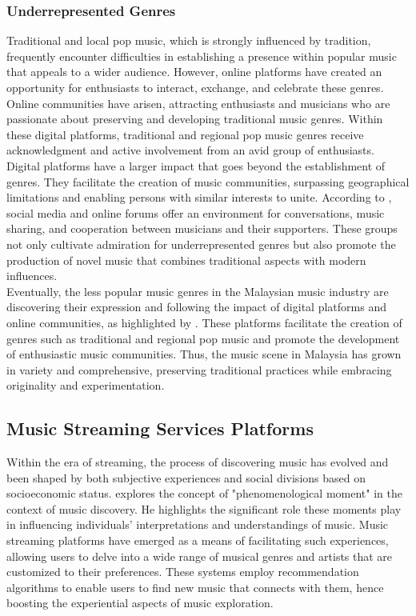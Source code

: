 \subsubsection{Underrepresented Genres}
Traditional and local pop music, which is strongly influenced by tradition, frequently encounter difficulties in establishing a presence within popular music that appeals to a wider audience. However, online platforms have created an opportunity for enthusiasts to interact, exchange, and celebrate these genres. Online communities have arisen, attracting enthusiasts and musicians who are passionate about preserving and developing traditional music genres. Within these digital platforms, traditional and regional pop music genres receive acknowledgment and active involvement from an avid group of enthusiasts. \\

Digital platforms have a larger impact that goes beyond the establishment of genres. They facilitate the creation of music communities, surpassing geographical limitations and enabling persons with similar interests to unite. According to \textcite{silahudin19}, social media and online forums offer an environment for conversations, music sharing, and cooperation between musicians and their supporters. These groups not only cultivate admiration for underrepresented genres but also promote the production of novel music that combines traditional aspects with modern influences. \\

Eventually, the less popular music genres in the Malaysian music industry are discovering their expression and following the impact of digital platforms and online communities, as highlighted by \textcite{silahudin19}. These platforms facilitate the creation of genres such as traditional and regional pop music and promote the development of enthusiastic music communities. Thus, the music scene in Malaysia has grown in variety and comprehensive, preserving traditional practices while embracing originality and experimentation.

\subsection{Music Streaming Services Platforms}
Within the era of streaming, the process of discovering music has evolved and been shaped by both subjective experiences and social divisions based on socioeconomic status. \textcite{ellis20} explores the concept of "phenomenological moment" in the context of music discovery. He highlights the significant role these moments play in influencing individuals' interpretations and understandings of music. Music streaming platforms have emerged as a means of facilitating such experiences, allowing users to delve into a wide range of musical genres and artists that are customized to their preferences. These systems employ recommendation algorithms to enable users to find new music that connects with them, hence boosting the experiential aspects of music exploration. \\

